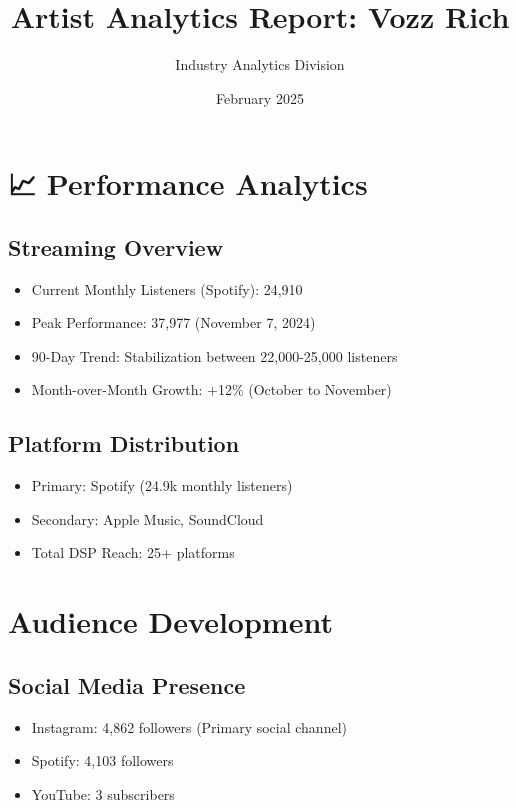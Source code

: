\documentclass{article}
\begin{document}
\title{\textbf{Artist Analytics Report: Vozz Rich}}
\author{Industry Analytics Division}
\date{February 2025}
\maketitle

\section*{📈 Performance Analytics}

\subsection*{Streaming Overview}
\begin{itemize}
\item Current Monthly Listeners (Spotify): 24,910
\item Peak Performance: 37,977 (November 7, 2024)
\item 90-Day Trend: Stabilization between 22,000-25,000 listeners
\item Month-over-Month Growth: +12\% (October to November)
\end{itemize}

\subsection*{Platform Distribution}
\begin{itemize}
\item Primary: Spotify (24.9k monthly listeners)
\item Secondary: Apple Music, SoundCloud
\item Total DSP Reach: 25+ platforms
\end{itemize}

\section*{Audience Development}

\subsection*{Social Media Presence}
\begin{itemize}
\item Instagram: 4,862 followers (Primary social channel)
\item Spotify: 4,103 followers
\item YouTube: 3 subscribers
\end{itemize}
\end{document}

